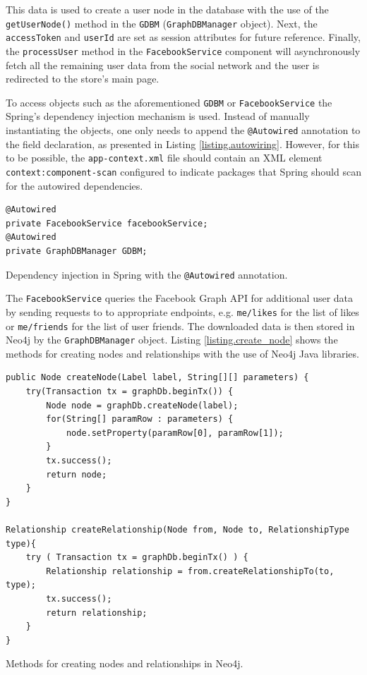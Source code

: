 \documentclass[12pt]{report}
\begin{document}
This data is used to create a user node in the database with the use of the \texttt{getUserNode()} method in the \texttt{GDBM} (\texttt{Graph\-DB\-Manager} object). Next, the \texttt{access\-Token} and \texttt{userId} are set as session attributes for future reference. Finally, the \texttt{process\-User} method in the \texttt{Facebook\-Service} component will asynchronously fetch all the remaining user data from the social network and the user is redirected to the store's main page.

\hbox{}
To access objects such as the aforementioned \texttt{GDBM} or \texttt{Facebook\-Service} the Spring's dependency injection mechanism is used. Instead of manually instantiating the objects, one only needs to append the \texttt{@Autowired} annotation to the field declaration, as presented in Listing \ref{listing.autowiring}. However, for this to be possible, the \texttt{app-context.xml} file should contain an XML element \texttt{context:\-component\--scan} configured to indicate packages that Spring should scan for the autowired dependencies.

\begin{listing}
\begin{verbatim}
@Autowired
private FacebookService facebookService;
@Autowired
private GraphDBManager GDBM;
\end{verbatim}
\caption{Dependency injection in Spring with the \texttt{@Autowired} annotation.}
\label{listing.autowiring}
\end{listing}

The \texttt{FacebookService} queries the Facebook Graph API for additional user data by sending requests to to appropriate endpoints, e.g. \texttt{me/likes} for the list of likes or \texttt{me/friends} for the list of user friends. The downloaded data is then stored in Neo4j by the \texttt{GraphDBManager} object. Listing \ref{listing.create_node} shows the methods for creating nodes and relationships with the use of Neo4j Java libraries.

\begin{listing}
\begin{verbatim}
public Node createNode(Label label, String[][] parameters) {
    try(Transaction tx = graphDb.beginTx()) {
        Node node = graphDb.createNode(label);
        for(String[] paramRow : parameters) {
            node.setProperty(paramRow[0], paramRow[1]);
        }
        tx.success();
        return node;
    }
}

Relationship createRelationship(Node from, Node to, RelationshipType type){
    try ( Transaction tx = graphDb.beginTx() ) {
        Relationship relationship = from.createRelationshipTo(to, type);
        tx.success();
        return relationship;
    }
}
\end{verbatim}
\caption{Methods for creating nodes and relationships in Neo4j.}
\label{listing.create_node}
\end{listing}
\end{document}
